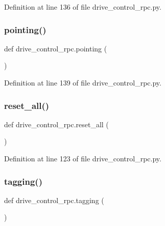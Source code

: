 Definition at line 136 of file drive\+\_\+control\+\_\+rpc.\+py.

\mbox{\label{namespacedrive__control__rpc_a276bd344b00a65b4a41241ce49cff801}} 
\subsubsection{\texorpdfstring{pointing()}{pointing()}}
{\footnotesize\ttfamily def drive\+\_\+control\+\_\+rpc.\+pointing (\begin{DoxyParamCaption}{ }\end{DoxyParamCaption})}



Definition at line 139 of file drive\+\_\+control\+\_\+rpc.\+py.

\mbox{\label{namespacedrive__control__rpc_a8f61b938d2a8ea371c72117f123841d3}} 
\subsubsection{\texorpdfstring{reset\+\_\+all()}{reset\_all()}}
{\footnotesize\ttfamily def drive\+\_\+control\+\_\+rpc.\+reset\+\_\+all (\begin{DoxyParamCaption}{ }\end{DoxyParamCaption})}



Definition at line 123 of file drive\+\_\+control\+\_\+rpc.\+py.

\mbox{\label{namespacedrive__control__rpc_abe2d88b19ce544598171e788d121086f}} 
\subsubsection{\texorpdfstring{tagging()}{tagging()}}
{\footnotesize\ttfamily def drive\+\_\+control\+\_\+rpc.\+tagging (\begin{DoxyParamCaption}{ }\end{DoxyParamCaption})}



